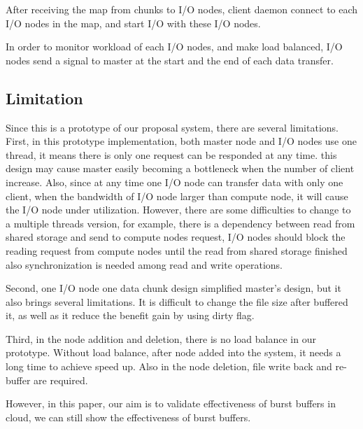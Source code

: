 After receiving the map from chunks to I/O nodes, client daemon connect to each I/O
nodes in the map, and start I/O with these I/O nodes.

In order to monitor workload of each I/O nodes, and make load balanced, I/O nodes send a signal to
master at the start and the end of each data transfer.

\subsection{Limitation}

Since this is a prototype of our proposal system, there are several limitations.
First, in this prototype implementation, both master node and I/O nodes use one thread, it means
there is only one request can be responded at any time.
this design may cause master easily becoming a bottleneck when the number of client increase.
Also, since at any time one I/O node can transfer data with only one client, when the bandwidth of
I/O node larger than compute node, it will cause the I/O node under utilization.
However, there are some difficulties to change to a multiple threads version, for example, there
is a dependency between read from shared storage and send to compute nodes request, I/O nodes should
block the reading request from compute nodes until the read from shared storage finished also
synchronization is needed among read and write operations.

Second, one I/O node one data chunk design simplified master's design, but it also brings several
limitations. It is difficult to change the file size after buffered it, as well as it reduce the
benefit gain by using dirty flag.

Third, in the node addition and deletion, there is no load balance in our prototype.
Without load balance, after node added into the system, it needs a long time to achieve speed up.
Also in the node deletion, file write back and re-buffer are required.

However, in this paper, our aim is to validate effectiveness of burst buffers in cloud, we can still
show the effectiveness of burst buffers.


